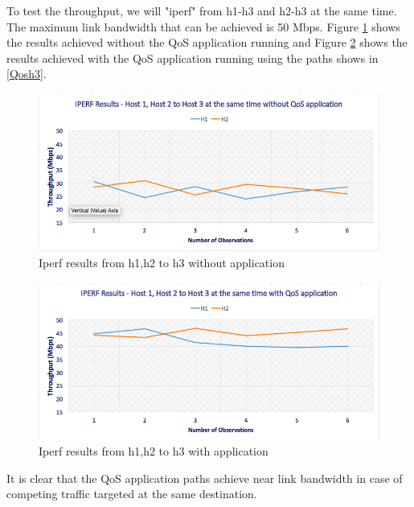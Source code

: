 \documentclass[paper=a4, fontsize=12pt]{scrartcl}	%
\numberwithin{equation}{section}		%
\numberwithin{figure}{section}			%
\numberwithin{table}{section}				%
\begin{document}
To test the throughput, we will "iperf" from h1-h3 and h2-h3 at the same time. The maximum link bandwidth that can be achieved is 50 Mbps. Figure \ref{h123WO} shows the results achieved without the QoS application running and Figure \ref{h123W} shows the results achieved with the QoS application running using the paths shows in \ref{Qosh3}. 
\begin{figure}[H]
\begin{center}
\includegraphics[scale=0.45]{h123WO.png}   
\end{center}
 \caption{Iperf results from h1,h2 to h3 without application}
 \label{h123WO}
\end{figure}
\begin{figure}[H]
\begin{center}
\includegraphics[scale=0.45]{h123W.png}   
\end{center}
 \caption{Iperf results from h1,h2 to h3 with application}
 \label{h123W}
\end{figure}
It is clear that the QoS application paths achieve near link bandwidth in case of competing traffic targeted at the same destination.
\end{document}

